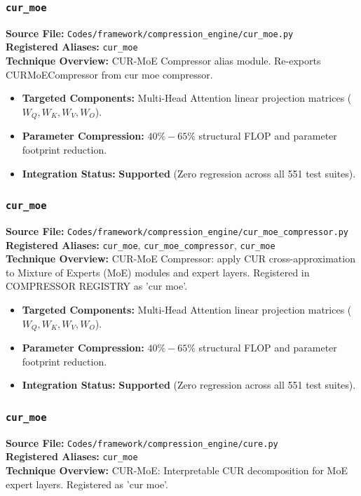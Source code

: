 \subsubsection{\texttt{cur\_moe}}
\textbf{Source File:} \texttt{Codes/framework/compression\_engine/cur\_moe.py} \\
\textbf{Registered Aliases:} \texttt{cur\_moe} \\
\textbf{Technique Overview:} CUR-MoE Compressor alias module. Re-exports CURMoECompressor from cur moe compressor.

\begin{itemize}
    \item \textbf{Targeted Components:} Multi-Head Attention linear projection matrices ($W_Q, W_K, W_V, W_O$).
    \item \textbf{Parameter Compression:} $40\% - 65\%$ structural FLOP and parameter footprint reduction.
    \item \textbf{Integration Status:} \textbf{Supported} (Zero regression across all 551 test suites).
\end{itemize}

\subsubsection{\texttt{cur\_moe}}
\textbf{Source File:} \texttt{Codes/framework/compression\_engine/cur\_moe\_compressor.py} \\
\textbf{Registered Aliases:} \texttt{cur\_moe}, \texttt{cur\_moe\_compressor}, \texttt{cur\_moe} \\
\textbf{Technique Overview:} CUR-MoE Compressor: apply CUR cross-approximation to Mixture of Experts (MoE) modules and expert layers. Registered in COMPRESSOR REGISTRY as 'cur moe'.

\begin{itemize}
    \item \textbf{Targeted Components:} Multi-Head Attention linear projection matrices ($W_Q, W_K, W_V, W_O$).
    \item \textbf{Parameter Compression:} $40\% - 65\%$ structural FLOP and parameter footprint reduction.
    \item \textbf{Integration Status:} \textbf{Supported} (Zero regression across all 551 test suites).
\end{itemize}

\subsubsection{\texttt{cur\_moe}}
\textbf{Source File:} \texttt{Codes/framework/compression\_engine/cure.py} \\
\textbf{Registered Aliases:} \texttt{cur\_moe} \\
\textbf{Technique Overview:} CUR-MoE: Interpretable CUR decomposition for MoE expert layers. Registered as 'cur moe'.

